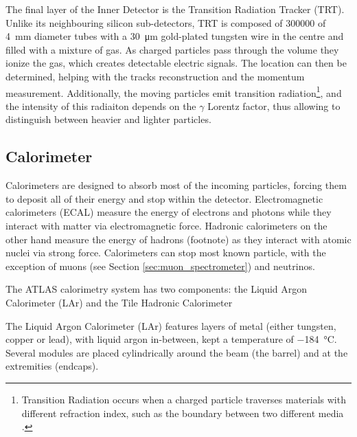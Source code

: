 The final layer of the Inner Detector is the Transition Radiation Tracker (TRT). Unlike its neighbouring silicon sub-detectors, TRT is composed of \num{300000} of \qty{4}{\milli\meter} diameter tubes with a \qty{30}{\micro\meter} gold-plated tungsten wire in the centre and filled with a mixture of gas. As charged particles pass through the volume they ionize the gas, which creates detectable electric signals. The location can then be determined, helping with the tracks reconstruction and the momentum measurement. Additionally, the moving particles emit transition radiation\footnote{Transition Radiation occurs when a charged particle traverses materials with different refraction index, such as the boundary between two different media \cite{wikipediaTransitionRadiation}.}, and the intensity of this radiaiton depends on the $\gamma$ Lorentz factor, thus allowing to distinguish between heavier and lighter particles.


\subsection{Calorimeter}\label{sec:ATLAS_calorimeter}


Calorimeters are designed to absorb most of the incoming particles, forcing them to deposit all of their energy and stop within the detector. Electromagnetic calorimeters (ECAL) measure the energy of electrons and photons while they interact with matter via electromagnetic force. Hadronic calorimeters on the other hand measure the energy of hadrons (footnote) as they interact with atomic nuclei via strong force. Calorimeters can stop most known particle, with the exception of muons (see Section \ref{sec:muon_spectrometer}) and neutrinos.

The ATLAS calorimetry system has two components: the Liquid Argon Calorimeter (LAr) and the Tile Hadronic Calorimeter

The Liquid Argon Calorimeter (LAr) features layers of metal (either tungsten, copper or lead), with liquid argon in-between, kept a temperature of \qty{-184}{\degreeCelsius}. Several modules are placed cylindrically around the beam (the barrel) and at the extremities (endcaps).

